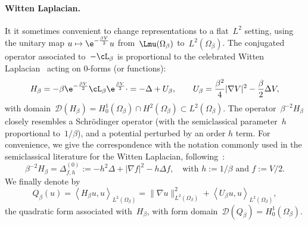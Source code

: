     \paragraph{Witten Laplacian.}
    It it sometimes convenient to change representations to a flat~$L^2$ setting, using the unitary map $u\mapsto \e^{-\frac{\beta V}2}u$ from~$\Lmu(\Omega_\beta)$ to~$L^2(\Omega_\beta)$. The conjugated operator associated to~$-\cL_\beta$ is proportional to the celebrated Witten Laplacian~\cite{W82} acting on 0-forms (or functions):
    \begin{equation}
        \label{02:eq:witten_laplacian}
        H_{\beta} = -\beta \e^{-\frac{\beta V}2} \cL_\beta \e^{\frac{\beta V}2}\cdot = - \Delta + U_\beta ,\qquad U_\beta = \frac{\beta^2}4|\nabla V|^2 - \frac{\beta}2 \Delta V,
    \end{equation}
    with domain~$\mathcal D(H_\beta)=H_0^1(\Omega_\beta)\cap H^2(\Omega_\beta) \subset L^2(\Omega_\beta)$. The operator~$\beta^{-2}H_\beta$ closely resembles a Schr\"odinger operator (with the semiclassical parameter~$h$ proportional to~$1/\beta$), and a potential perturbed by an order $h$ term.
    For convenience, we give the correspondence with the notation commonly used in the semiclassical literature for the Witten Laplacian, following~\cite{HKN04}:
    \begin{equation}
        \beta^{-2}H_\beta = \Delta_{f,h}^{(0)} := - h^2 \Delta+|\nabla f|^2 -h\Delta f  ,\quad\text{with } h := 1/\beta\text{ and } f := V/2.
    \end{equation}
    We finally denote by
    \begin{equation}
        \label{02:eq:witten_quad_form}
        Q_\beta(u) = \left\langle H_\beta u , u\right\rangle_{L^2(\Omega_\beta)} = \|\nabla u\|_{L^2(\Omega_\beta)}^2+\left\langle U_\beta u ,u \right\rangle_{L^2(\Omega_\beta)},
    \end{equation}
    the quadratic form associated with~$H_\beta$, with form domain~$\mathcal D(Q_\beta) = H_0^1(\Omega_\beta)$.
